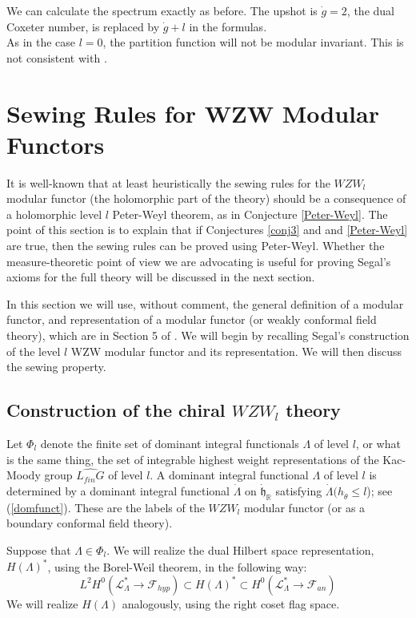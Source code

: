 \documentclass{amsart}
\theoremstyle{conjecture}
\theoremstyle{definition}
\theoremstyle{question}
\theoremstyle{questions}
\theoremstyle{remark}
\theoremstyle{remarks}
\theoremstyle{example}
\numberwithin{equation}{section}
\begin{document}
We can calculate the spectrum exactly as before. The upshot is $\dot g=2$, the dual Coxeter number, is replaced
by $\dot g+l$ in the formulas.\\

As in the case $l=0$, the partition function will not be modular invariant. This is not consistent with \cite{Bernard}.




\section{Sewing Rules for WZW Modular Functors}\label{sewing}

It is well-known that at least heuristically the sewing rules for the $WZW_l$ modular
functor (the holomorphic part of the theory) should be a consequence of a holomorphic level $l$ Peter-Weyl theorem,
as in Conjecture \ref{Peter-Weyl}. The point of this section is to explain that if Conjectures \ref{conj3}
and and \ref{Peter-Weyl} are true, then the sewing rules can be proved using Peter-Weyl.
Whether the measure-theoretic point of view we are advocating is useful for proving Segal's axioms
for the full theory will be discussed in the next section.

In this section we will use, without comment, the
general definition of a modular functor, and
representation of a modular functor (or weakly
conformal field theory), which are in Section 5 of \cite{Segal}.  We
will begin by recalling Segal's construction of the level $l$
WZW modular functor and its representation.  We will
then discuss the sewing property.


\subsection{ Construction of the chiral $WZW_l$ theory}

Let $\Phi_l$ denote the finite set of dominant integral functionals $\Lambda$
of level $l$, or what is the same thing, the set of integrable highest weight
representations of the Kac-Moody group $\widehat {L_{fin}G}$ of level $
l$. A dominant integral functional $\Lambda$ of level $l$ is determined
by a dominant integral functional $\dot \Lambda$ on $\dot{\mathfrak h}_{\mathbb R}$
 satisfying $\dot\Lambda(h_{\dot\theta}\le l$); see (\ref{domfunct}).
These are the labels of the $WZW_l$ modular functor (or as a boundary conformal field theory).

Suppose that $\Lambda\in\Phi_l$.  We will realize the dual Hilbert
space representation, $H(\Lambda )^{*}$, using the Borel-Weil
theorem, in the following way:
\begin{equation}\label{7.1.1}L^2H^0(\mathcal L^{*}_{\Lambda}\to \mathcal F_{hyp})\subset H(\Lambda
)^{*}\subset H^0(\mathcal L_{\Lambda}^{*}\to \mathcal F_{an})\end{equation}
We will realize $H(\Lambda )$ analogously, using the right coset
flag space.
\end{document}
